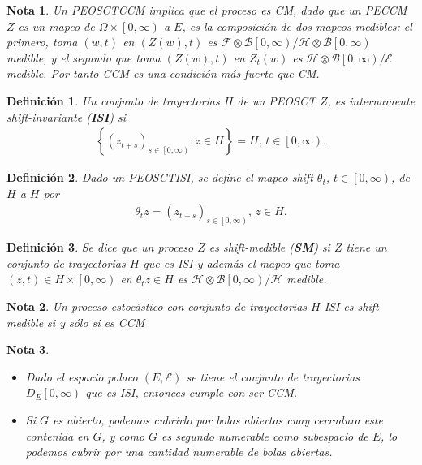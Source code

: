 \documentclass{article}
\newtheorem{Def}{Definición}[section]
\newtheorem{Note}{Nota}[section]
\numberwithin{equation}{section}
\begin{document}
\begin{Note}
Un PEOSCTCCM implica que el proceso es CM, dado que un PECCM $Z$ es un mapeo de $\Omega\times\left[0,\infty\right)$ a $E$, es la composici\'on de dos mapeos medibles: el primero, toma $\left(w,t\right)$ en $\left(Z\left(w\right),t\right)$ es $\mathcal{F}\otimes\mathcal{B}\left[0,\infty\right)/\mathcal{H}\otimes\mathcal{B}\left[0,\infty\right)$ medible, y el segundo que toma $\left(Z\left(w\right),t\right)$  en $Z_{t}\left(w\right)$ es $\mathcal{H}\otimes\mathcal{B}\left[0,\infty\right)/\mathcal{E}$ medible. Por tanto CCM es una condici\'on m\'as fuerte que CM.
\end{Note}

\begin{Def}
Un conjunto de trayectorias $H$ de un PEOSCT $Z$, es internamente shift-invariante (\textbf{ISI}) si 
\begin{eqnarray}
\left\{\left(z_{t+s}\right)_{s\in\left[0,\infty\right)}:z\in H\right\}=H\textrm{, }t\in\left[0,\infty\right).
\end{eqnarray}
\end{Def}


\begin{Def}
Dado un PEOSCTISI, se define el mapeo-shift $\theta_{t}$, $t\in\left[0,\infty\right)$, de $H$ a $H$ por 
\begin{eqnarray}
\theta_{t}z=\left(z_{t+s}\right)_{s\in\left[0,\infty\right)}\textrm{, }z\in H.
\end{eqnarray}
\end{Def}

\begin{Def}
Se dice que un proceso $Z$ es shift-medible (\textbf{SM}) si $Z$ tiene un conjunto de trayectorias $H$ que es ISI y adem\'as el mapeo que toma $\left(z,t\right)\in H\times\left[0,\infty\right)$ en $\theta_{t}z\in H$ es $\mathcal{H}\otimes\mathcal{B}\left[0,\infty\right)/\mathcal{H}$ medible.
\end{Def}

\begin{Note}
Un proceso estoc\'astico con conjunto de trayectorias $H$ ISI es shift-medible si y s\'olo si es CCM
\end{Note}

\begin{Note}
\begin{itemize}
\item Dado el espacio polaco $\left(E,\mathcal{E}\right)$ se tiene el  conjunto de trayectorias $D_{E}\left[0,\infty\right)$ que es ISI, entonces cumple con ser CCM.

\item Si $G$ es abierto, podemos cubrirlo por bolas abiertas cuay cerradura este contenida en $G$, y como $G$ es segundo numerable como subespacio de $E$, lo podemos cubrir por una cantidad numerable de bolas abiertas.

\end{itemize}
\end{Note}
\end{document}
